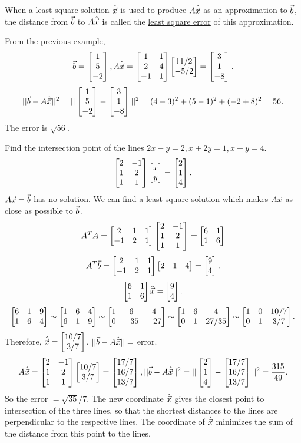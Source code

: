 \documentclass[10pt,a4paper]{article}
\begin{document}
When a least square solution $\hat{\vec{x}}$ is used to produce $A\hat{\vec{x}}$ as an approximation to $\vec{b}$, the distance from $\vec{b}$ to $A\hat{\vec{x}}$ is called the \underline{least square error} of this approximation.
\begin{example}
	From the previous example,
	$$\vec{b} = \begin{bmatrix}1\\5\\-2\end{bmatrix},A\hat{\vec{x}} = \begin{bmatrix}1&1\\2&4\\-1&1\end{bmatrix}\begin{bmatrix}11/2\\-5/2\end{bmatrix} = \begin{bmatrix}3\\1\\-8\end{bmatrix}.$$
	$$||\vec{b}-A\hat{\vec{x}}||^2 = ||\begin{bmatrix}1\\5\\-2\end{bmatrix} - \begin{bmatrix}3\\1\\-8\end{bmatrix}||^2 = (4-3)^2+(5-1)^2 + (-2+8)^2 = 56.$$
	The error is $\sqrt{56}$.
\end{example}
\begin{example}
	Find the intersection point of the lines $2x-y=2,x+2y=1,x+y=4$.
	$$\begin{bmatrix}2&-1\\1&2\\1&1\end{bmatrix}\begin{bmatrix}x\\y\end{bmatrix} = \begin{bmatrix}2\\1\\4\end{bmatrix}.$$
	$A\vec{x}=\vec{b}$ has no solution. We can find a least square solution which makes $A\vec{x}$ as close as possible to $\vec{b}$.
	$$A^TA = \begin{bmatrix}2&1&1\\-1&2&1\end{bmatrix}\begin{bmatrix}2&-1\\1&2\\1&1\end{bmatrix} = \begin{bmatrix}6&1\\1&6\end{bmatrix}$$
	$$A^T\vec{b} = \begin{bmatrix}2&1&1\\-1&2&1\end{bmatrix}\begin{bmatrix}2&1&4\end{bmatrix} = \begin{bmatrix}9\\4\end{bmatrix}.$$
	$$\begin{bmatrix}6&1\\1&6\end{bmatrix}\hat{\vec{x}} = \begin{bmatrix}9\\4\end{bmatrix}.$$
	$$\begin{bmatrix}6&1&9\\1&6&4\end{bmatrix} \sim \begin{bmatrix}1&6&4\\6&1&9\end{bmatrix} \sim \begin{bmatrix}1&6&4\\0&-35&-27\end{bmatrix} \sim \begin{bmatrix}1&6&4\\0&1&27/35\end{bmatrix} \sim \begin{bmatrix}1&0&10/7\\0&1&3/7\end{bmatrix}.$$
	Therefore, $\hat{\vec{x}} = \begin{bmatrix}10/7\\3/7\end{bmatrix}$.
	$||\vec{b}-A\hat{\vec{x}}|| = $ error.
	$$A\hat{\vec{x}} = \begin{bmatrix}2&-1\\1&2\\1&1\end{bmatrix}\begin{bmatrix}10/7\\3/7\end{bmatrix} = \begin{bmatrix}17/7\\16/7\\13/7\end{bmatrix}, ||\vec{b}-A\hat{\vec{x}}||^2 = ||\begin{bmatrix}2\\1\\4\end{bmatrix} - \begin{bmatrix}17/7\\16/7\\13/7\end{bmatrix}||^2 = \frac{315}{49}.$$
	So the error $ = \sqrt{35}/7$.
	The new coordinate $\hat{\vec{x}}$ gives the closest point to intersection of the three lines, so that the shortest distances to the lines are perpendicular to the respective lines.
	The coordinate of $\hat{\vec{x}}$ minimizes the sum of the distance from this point to the lines.
\end{example}
\end{document}
